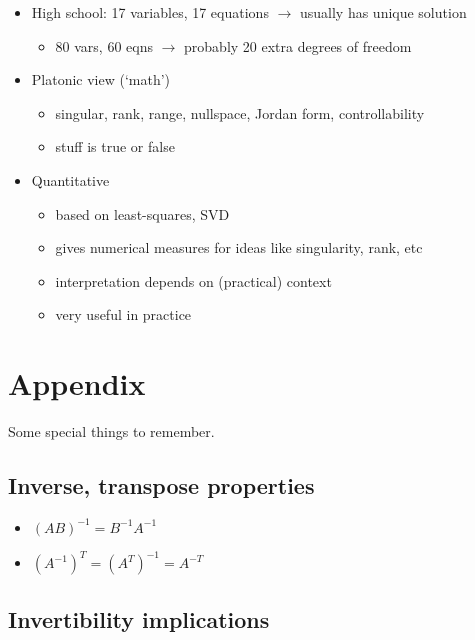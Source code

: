 \documentclass[10pt,letterpaper]{article}
\begin{document}
\begin{itemize}
\item High school: 17 variables, 17 equations $\rightarrow$ usually has unique solution

\begin{itemize}
\item 80 vars, 60 eqns $\rightarrow$ probably 20 extra degrees of freedom
\end{itemize}

\item Platonic view (`math')

\begin{itemize}
\item singular, rank, range, nullspace, Jordan form, controllability
\item stuff is true or false
\end{itemize}

\item Quantitative

\begin{itemize}
\item based on least-squares, SVD
\item gives numerical measures for ideas like singularity, rank, etc
\item interpretation depends on (practical) context
\item very useful in practice
\end{itemize}

\end{itemize}
\section{Appendix}
\label{sec-20}

Some special things to remember.
\subsection{Inverse, transpose properties}
\label{sec-20_1}

\begin{itemize}
\item $(AB) ^{-1} = B ^{-1} A ^{-1}$
\item $(A ^{-1}) ^{T} = (A ^{T}) ^{-1}= A ^{-T}$
\end{itemize}
\subsection{Invertibility implications}
\label{sec-20_2}
\end{document}
